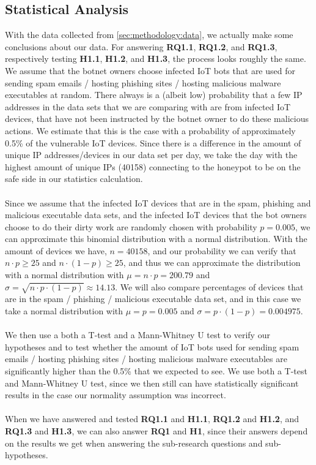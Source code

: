 \documentclass[a4paper,10pt]{article}
\begin{document}
\subsection{Statistical Analysis} \label{sec:methodology:stat_analysis}
With the data collected from \autoref{sec:methodology:data}, we actually make some conclusions about our data.
For answering \textbf{RQ1.1}, \textbf{RQ1.2}, and \textbf{RQ1.3}, respectively testing \textbf{H1.1}, \textbf{H1.2}, 
and \textbf{H1.3}, the process looks roughly the same. We assume that the botnet owners choose infected IoT bots 
that are used for sending spam emails / hosting phishing sites / hosting malicious malware executables at random.
There always is a (albeit low) probability that a few IP addresses in the data sets that we are comparing with are from 
infected IoT devices, that have not been instructed by the botnet owner to do these malicious actions. We estimate 
that this is the case with a probability of approximately 0.5\% of the vulnerable IoT devices. Since there is a difference 
in the amount of unique IP addresses/devices in our data set per day, we take the day with the highest amount of unique 
IPs (40158) connecting to the honeypot to be on the safe side in our statistics calculation.
\\\\
Since we assume that the infected IoT devices that are in the spam, phishing and malicious executable data sets, 
and the infected IoT devices that the bot owners choose to do their dirty work are randomly chosen with probability
$p = 0.005$, we can approximate this binomial distribution with a normal distribution. With the amount of devices
we have, $n = 40158$, and our probability we can verify that $n \cdot p \geq 25$ and $n \cdot (1-p) \geq 25$, and
thus we can approximate the distribution with a normal distribution with $\mu = n \cdot p = 200.79$ and 
$\sigma = \sqrt{n \cdot p \cdot (1-p)} \approx 14.13$. We will also compare percentages of devices that are
in the spam / phishing / malicious executable data set, and in this case we take a normal distribution with 
$\mu = p =0.005$ and  $\sigma = p \cdot (1-p) = 0.004975$.
\\\\
We then use a both a T-test and a Mann-Whitney U test to verify our hypotheses and to  test whether the amount 
of IoT bots used for sending spam emails / hosting phishing sites / hosting malicious malware executables are 
significantly higher than the 0.5\% that we expected to see. We use both a T-test and Mann-Whitney U test,
since we then still can have statistically significant results in the case our normality assumption was incorrect.
\\\\
When we have answered and tested \textbf{RQ1.1} and \textbf{H1.1}, \textbf{RQ1.2} and \textbf{H1.2}, and 
\textbf{RQ1.3} and \textbf{H1.3}, we can also answer \textbf{RQ1} and \textbf{H1}, since their answers
depend on the results we get when answering the sub-research questions and sub-hypotheses.
\end{document}
